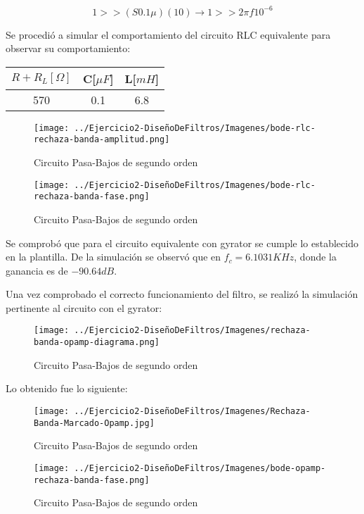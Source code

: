 $$1 >> (S0.1 \mu )(10) \longrightarrow 1  >> 2 \pi f 10^{-6}$$

Se procedió a simular el comportamiento del circuito RLC equivalente para observar su comportamiento:

\begin{table}[H]
    \centering
    \begin{tabular}{|c|c|c|}
    \hline
    \rowcolor[HTML]{C0C0C0} 
    $R+R_L[\Omega]$ & C[$\mu F$] & L[$mH$]  \\ \hline
    570      & 0.1  & 6.8 \\ \hline
    \end{tabular}
    \end{table}

\begin{figure}[H]
    \centering
    \texttt{[image: ../Ejercicio2-DiseñoDeFiltros/Imagenes/bode-rlc-rechaza-banda-amplitud.png]}
    \caption{Circuito Pasa-Bajos de segundo orden}
\end{figure}

\begin{figure}[H]
    \centering
    \texttt{[image: ../Ejercicio2-DiseñoDeFiltros/Imagenes/bode-rlc-rechaza-banda-fase.png]}
    \caption{Circuito Pasa-Bajos de segundo orden}
\end{figure}

Se comprobó que para el circuito equivalente con gyrator se cumple lo establecido en la plantilla.
De la simulación se observó que en $f_c=6.1031 KHz$, donde la ganancia es de $-90.64 dB$.

Una vez comprobado el correcto funcionamiento del filtro, se realizó la simulación pertinente al circuito
con el gyrator:

\begin{figure}[H]
    \centering
    \texttt{[image: ../Ejercicio2-DiseñoDeFiltros/Imagenes/rechaza-banda-opamp-diagrama.png]}
    \caption{Circuito Pasa-Bajos de segundo orden}
\end{figure}

Lo obtenido fue lo siguiente:

\begin{figure}[H]
    \centering
    \texttt{[image: ../Ejercicio2-DiseñoDeFiltros/Imagenes/Rechaza-Banda-Marcado-Opamp.jpg]}
    \caption{Circuito Pasa-Bajos de segundo orden}
\end{figure}

\begin{figure}[H]
    \centering
    \texttt{[image: ../Ejercicio2-DiseñoDeFiltros/Imagenes/bode-opamp-rechaza-banda-fase.png]}
    \caption{Circuito Pasa-Bajos de segundo orden}
\end{figure}

